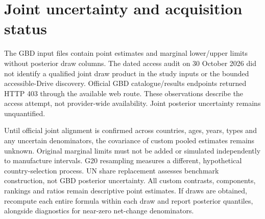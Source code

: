 \documentclass[11pt,a4paper]{article}
\begin{document}
\section{Joint uncertainty and acquisition status}
The GBD input files contain point estimates and marginal lower/upper limits without posterior draw columns. The dated access audit on 30 October 2026 did not identify a qualified joint draw product in the study inputs or the bounded accessible-Drive discovery. Official GBD catalogue/results endpoints returned HTTP 403 through the available web route. These observations describe the access attempt, not provider-wide availability. Joint posterior uncertainty remains unquantified.

Until official joint alignment is confirmed across countries, ages, years, types and any uncertain denominators, the covariance of custom pooled estimates remains unknown. Original marginal limits must not be added or simulated independently to manufacture intervals. G20 resampling measures a different, hypothetical country-selection process. UN share replacement assesses benchmark construction, not GBD posterior uncertainty. All custom contrasts, components, rankings and ratios remain descriptive point estimates. If draws are obtained, recompute each entire formula within each draw and report posterior quantiles, alongside diagnostics for near-zero net-change denominators.
\end{document}
